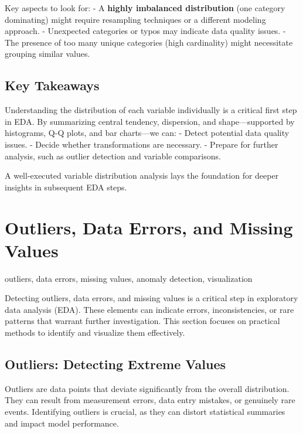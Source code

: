 \documentclass[12pt,openany, draft]{book}
\begin{document}
Key aspects to look for:
- A \textbf{highly imbalanced distribution} (one category dominating) might require resampling techniques or a different modeling approach.
- Unexpected categories or typos may indicate data quality issues.
- The presence of too many unique categories (high cardinality) might necessitate grouping similar values.


\subsection{Key Takeaways}

Understanding the distribution of each variable individually is a critical first step in EDA. By summarizing central tendency, dispersion, and shape—supported by histograms, Q-Q plots, and bar charts—we can:
- Detect potential data quality issues.
- Decide whether transformations are necessary.
- Prepare for further analysis, such as outlier detection and variable comparisons.

A well-executed variable distribution analysis lays the foundation for deeper insights in subsequent EDA steps.



\section{Outliers, Data Errors, and Missing Values}

\begin{keywordsbox}
outliers, data errors, missing values, anomaly detection, visualization
\end{keywordsbox}

Detecting outliers, data errors, and missing values is a critical step in 
exploratory data analysis (EDA). These elements can indicate errors, 
inconsistencies, or rare patterns that warrant further investigation. 
This section focuses on practical methods to identify and visualize them 
effectively.

\subsection{Outliers: Detecting Extreme Values}

Outliers are data points that deviate significantly from the overall 
distribution. They can result from measurement errors, data entry 
mistakes, or genuinely rare events. Identifying outliers is crucial, 
as they can distort statistical summaries and impact model performance.
\newline
\end{document}
